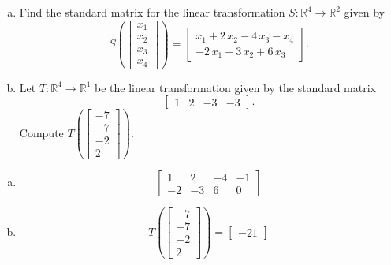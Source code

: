 
\begin{exerciseStatement}

\begin{enumerate}[(a)]
\item Find the standard matrix for the linear transformation \(S:\mathbb{R}^ 4  \to \mathbb{R}^ 2 \) given by \[S\left(  \left[\begin{array}{c}
x_{1} \\
x_{2} \\
x_{3} \\
x_{4}
\end{array}\right]  \right) =  \left[\begin{array}{c}
x_{1} + 2 \, x_{2} - 4 \, x_{3} - x_{4} \\
-2 \, x_{1} - 3 \, x_{2} + 6 \, x_{3}
\end{array}\right] .\]
\item Let \(T:\mathbb{R}^ 4  \to \mathbb{R}^ 1 \) be the linear transformation given by the standard matrix \[ \left[\begin{array}{cccc}
1 & 2 & -3 & -3
\end{array}\right] .\] Compute \(T\left( \left[\begin{array}{c}
-7 \\
-7 \\
-2 \\
2
\end{array}\right]  \right)\). 
\end{enumerate}
    
\end{exerciseStatement}
    
\begin{exerciseAnswer} 

\begin{enumerate}[(a)]
\item \[ \left[\begin{array}{cccc}
1 & 2 & -4 & -1 \\
-2 & -3 & 6 & 0
\end{array}\right] \]
\item \[T\left( \left[\begin{array}{c}
-7 \\
-7 \\
-2 \\
2
\end{array}\right]  \right)= \left[\begin{array}{c}
-21
\end{array}\right] \]
\end{enumerate}
    
\end{exerciseAnswer}
    
